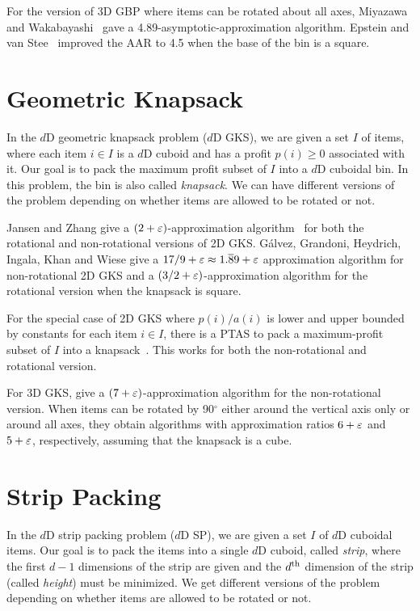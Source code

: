 For the version of 3D GBP where items can be rotated about all axes,
Miyazawa and Wakabayashi~\cite{miyazawa2009three} gave a
4.89-asymptotic-approximation algorithm.
Epstein and van Stee~\cite{epstein2006side} improved the AAR to
4.5 when the base of the bin is a square.

\section{Geometric Knapsack}

In the $d$D geometric knapsack problem ($d$D GKS), we are given a set $I$ of items,
where each item $i \in I$ is a $d$D cuboid and has a profit $p(i) \ge 0$ associated with it.
Our goal is to pack the maximum profit subset of $I$ into a $d$D cuboidal bin.
In this problem, the bin is also called \emph{knapsack}.
We can have different versions of the problem depending on whether items
are allowed to be rotated or not.

Jansen and Zhang give a $(2+\varepsilon)$-approximation algorithm~\cite{jansen2004rectangle}
for both the rotational and non-rotational versions of 2D GKS.
G\'alvez, Grandoni, Heydrich, Ingala, Khan and Wiese give a
$17/9 + \varepsilon \approx 1.\overline{8}9 + \varepsilon$ approximation algorithm
for non-rotational 2D GKS and a $(3/2 + \varepsilon)$-approximation algorithm
for the rotational version when the knapsack is square.

For the special case of 2D GKS where $p(i)/a(i)$ is lower and upper bounded by constants
for each item $i \in I$, there is a PTAS to pack a maximum-profit subset of $I$
into a knapsack~\cite{bansal2009structural}. This works for both the
non-rotational and rotational version.

For 3D GKS, \cite{diedrich2008approximation} give a $(7+\varepsilon)$-approximation
algorithm for the non-rotational version.
When items can be rotated by 90$^{\circ}$ either around the vertical axis only
or around all axes, they obtain algorithms with approximation ratios
$6 + \varepsilon$ and $5 + \varepsilon$, respectively, assuming that the knapsack is a cube.

\section{Strip Packing}

In the $d$D strip packing problem ($d$D SP),
we are given a set $I$ of $d$D cuboidal items.
Our goal is to pack the items into a single $d$D cuboid, called \emph{strip},
where the first $d-1$ dimensions of the strip are given
and the $d^{\textrm{th}}$ dimension of the strip (called \emph{height}) must be minimized.
We get different versions of the problem depending on whether
items are allowed to be rotated or not.


